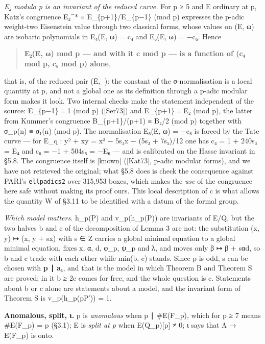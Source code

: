 \documentclass[11pt,a4paper]{article}
\theoremstyle{named}
\begin{document}
\textit{E₂ modulo p is an invariant of the reduced curve.} For p ≥ 5 and E ordinary at p, Katz's congruence E₂\textasciicircum{}* ≡ E\_\{p+1\}/E\_\{p−1\} (mod p) expresses the p-adic weight-two Eisenstein value through two classical forms, whose values on (E, ω) are isobaric polynomials in E₄(E, ω) = c₄ and E₆(E, ω) = −c₆. Hence

\begin{quote}
\textbf{E₂(E, ω) mod p — and with it c mod p — is a function of (c₄ mod p, c₆ mod p) alone},
\end{quote}

that is, of the reduced pair (Ē, ): the constant of the σ-normalisation is a local quantity at p, and not a global one as its definition through a p-adic modular form makes it look. Two internal checks make the statement independent of the source: E\_\{p−1\} ≡ 1 (mod p) ([Ser73]) and E\_\{p+1\} ≡ E₂ (mod p), the latter from Kummer's congruence B\_\{p+1\}/(p+1) ≡ B₂/2 (mod p) together with σ\_p(n) ≡ σ₁(n) (mod p). The normalisation E₆(E, ω) = −c₆ is forced by the Tate curve — for E\_q : y² + xy = x³ − 5s₃x − (5s₃ + 7s₅)/12 one has c₄ = 1 + 240s₃ = E₄ and c₆ = −1 + 504s₅ = −E₆ — and is calibrated on the Hasse invariant in §5.8. The congruence itself is [known] ([Kat73], p-adic modular forms), and we have not retrieved the original; what §5.8 does is check the consequence against PARI's \texttt{ellpadics2} over 315,953 boxes, which makes the \textit{use} of the congruence here safe without making its proof ours. This local description of c is what allows the quantity W of §3.11 to be identified with a datum of the formal group.

\textit{Which model matters.} h\_p(P) and v\_p(h\_p(P)) are invariants of E/Q, but the two halves b and c of the decomposition of Lemma 3 are not: the substitution (x, y) ↦ (x, y + sx) with s ∈ Z carries a global minimal equation to a global minimal equation, fixes x, α, d, φ\_p, ψ\_p and λ, and moves only β ↦ β + sαd, so b and c trade with each other while min(b, c) stands. Since p is odd, s can be chosen with \textbf{p ∣ a₁}, and that is the model in which Theorem B and Theorem S are proved; in it b ≥ 2e comes for free, and the whole question is c. Statements about b or c alone are statements about a model, and the invariant form of Theorem S is v\_p(h\_p(pP′)) = 1.

\textbf{Anomalous, split, ι.} p is \textit{anomalous} when p ∣ \#E(F\_p), which for p ≥ 7 means \#E(F\_p) = p (§3.1); E is \textit{split at p} when E(Q\_p)[p] ≠ 0; ι says that Λ → E(F\_p) is onto.
\end{document}
